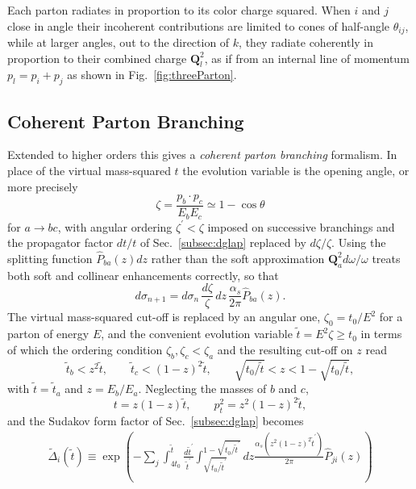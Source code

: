 Each parton radiates in proportion to its color charge squared. When \(i\) and \(j\) close in angle their incoherent
contributions are limited to cones of half-angle \(\theta_{ij}\), while at larger
angles, out to the direction of \(k\), they radiate coherently in proportion to
their combined charge \(\mathbf{Q}_l^2\), as if from an internal line of momentum
\(p_l = p_i+p_j\) as shown in Fig.~\ref{fig:threeParton}.

\subsection{Coherent Parton Branching}
\label{sec:coherentPartonBranching}
Extended to higher orders this gives a \emph{coherent parton branching} formalism.
In place of the virtual mass-squared \(t\) the evolution variable is the opening
angle, or more precisely
\begin{equation}
	\zeta = \frac{p_b\cdot p_c}{E_bE_c} \simeq 1-\cos\theta
	\label{eq:zeta}
\end{equation}
for \(a\to bc\), with angular ordering \(\zeta^\prime<\zeta\) imposed on successive
branchings and the propagator factor \(dt/t\) of Sec.~\ref{subsec:dglap} replaced by
\(d\zeta/\zeta\). Using the splitting function \(\hat{P}_{ba}(z)dz\) rather than the
soft approximation \(\mathbf{Q}_a^2d\omega/\omega\) treats both soft and collinear
enhancements correctly, so that
\begin{equation}
	d\sigma_{n+1} = d\sigma_n\,\frac{d\zeta}{\zeta}\,dz\,
	\frac{\alpha_s}{2\pi}\hat{P}_{ba}(z).
	\label{eq:coherentBranching}
\end{equation}
The virtual mass-squared cut-off is replaced by an angular one,
\(\zeta_0 = t_0/E^2\) for a parton of energy \(E\), and the convenient evolution
variable \(\tilde{t} = E^2\zeta \geq t_0\) in terms of which the ordering condition \(\zeta_b,\zeta_c<\zeta_a\) and the
resulting cut-off on \(z\) read
\begin{equation}
	\tilde{t}_b < z^2\tilde{t},
	\qquad
	\tilde{t}_c < (1-z)^2\tilde{t},
	\qquad
	\sqrt{t_0/\tilde{t}} < z < 1-\sqrt{t_0/\tilde{t}} ,
	\label{eq:orderingCutoff}
\end{equation}
with \(\tilde{t}=\tilde{t}_a\) and \(z=E_b/E_a\). Neglecting the masses of \(b\) and
\(c\),
\begin{equation}
	t = z(1-z)\tilde{t},
	\qquad
	p_t^2 = z^2(1-z)^2\tilde{t},
	\label{eq:tAndPt}
\end{equation}
and the Sudakov form factor of Sec.~\ref{subsec:dglap} becomes
\begin{align}
	\tilde{\Delta}_i(\tilde{t}) \equiv \exp(-\sum_j\int_{4t_0}^{\tilde{t}}
	\frac{d\tilde{t}^\prime}{\tilde{t}^\prime}
	\int_{\sqrt{t_0/\tilde{t}^\prime}}^{1-\sqrt{t_0/\tilde{t}^\prime}} dz
	\frac{\alpha_s(z^2(1-z)^2\tilde{t}^\prime)}{2\pi} \hat{P}_{ji}(z))
	\label{eq:coherentSudakov}
\end{align}

